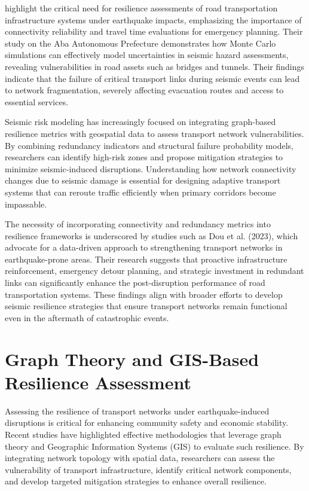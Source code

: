 \cite{dou2023} highlight the critical need for resilience assessments of road transportation infrastructure systems under earthquake impacts, emphasizing the importance of connectivity reliability and travel time evaluations for emergency planning. Their study on the Aba Autonomous Prefecture demonstrates how Monte Carlo simulations can effectively model uncertainties in seismic hazard assessments, revealing vulnerabilities in road assets such as bridges and tunnels. Their findings indicate that the failure of critical transport links during seismic events can lead to network fragmentation, severely affecting evacuation routes and access to essential services.

Seismic risk modeling has increasingly focused on integrating graph-based resilience metrics with geospatial data to assess transport network vulnerabilities. By combining redundancy indicators and structural failure probability models, researchers can identify high-risk zones and propose mitigation strategies to minimize seismic-induced disruptions. Understanding how network connectivity changes due to seismic damage is essential for designing adaptive transport systems that can reroute traffic efficiently when primary corridors become impassable.

The necessity of incorporating connectivity and redundancy metrics into resilience frameworks is underscored by studies such as Dou et al. (2023), which advocate for a data-driven approach to strengthening transport networks in earthquake-prone areas. Their research suggests that proactive infrastructure reinforcement, emergency detour planning, and strategic investment in redundant links can significantly enhance the post-disruption performance of road transportation systems. These findings align with broader efforts to develop seismic resilience strategies that ensure transport networks remain functional even in the aftermath of catastrophic events.

\section{Graph Theory and GIS-Based Resilience Assessment}
Assessing the resilience of transport networks under earthquake-induced disruptions is critical for enhancing community safety and economic stability. Recent studies have highlighted effective methodologies that leverage graph theory and Geographic Information Systems (GIS) to evaluate such resilience. By integrating network topology with spatial data, researchers can assess the vulnerability of transport infrastructure, identify critical network components, and develop targeted mitigation strategies to enhance overall resilience.

